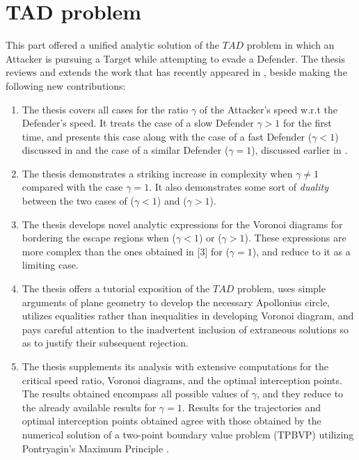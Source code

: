 \section{TAD problem}
This part offered a unified analytic solution of the $TAD$ problem in which an Attacker is pursuing a Target while attempting to evade a Defender. The thesis reviews and extends the work that has recently appeared in \cite{pachter2014active,garcia2015active,garcia2015escape}, beside making the following new contributions:

\begin{enumerate}
\item The thesis covers all cases for the ratio $\gamma$ of the Attacker's speed w.r.t the Defender's speed. It treats the case of a slow Defender $\gamma>1$ for the first time, and presents this case along with the case of a fast Defender ($\gamma<1$) discussed in \cite{garcia2015active} and the case of a similar Defender ($\gamma=1$), discussed earlier in \cite{pachter2014active,garcia2015escape}.
\item The thesis demonstrates a striking increase in complexity when $\gamma\neq1$ compared with the case $\gamma=1$. It also demonstrates some sort of \textit{duality} between the two cases of ($\gamma<1$) and ($\gamma>1$).
\item The thesis develops novel analytic expressions for the Voronoi diagrams for bordering the escape regions when ($\gamma<1$) or ($\gamma>1$). These expressions are more complex than the ones obtained in [3] for ($\gamma=1$), and reduce to it as a limiting case.
\item The thesis offers a tutorial exposition of the $TAD$ problem, uses simple arguments of plane geometry to develop the necessary Apollonius circle, utilizes equalities rather than inequalities in developing Voronoi diagram, and pays careful attention to the inadvertent inclusion of extraneous solutions so as to justify their subsequent rejection.
\item The thesis supplements its analysis with extensive computations for the critical speed ratio, Voronoi diagrams, and the optimal interception points. The results obtained encompass all possible values of $\gamma$, and they reduce to the already available results for $\gamma=1$. Results for the trajectories and optimal interception points obtained agree with those obtained by the numerical solution of a two-point boundary value problem (TPBVP) utilizing Pontryagin's Maximum Principle \cite{garcia2015active}.     
\end{enumerate}  

